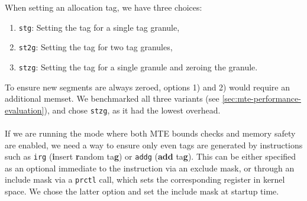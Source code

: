 When setting an allocation tag, we have three choices:
\begin{enumerate}
  \item \texttt{stg}: Setting the tag for a single tag granule,
  \item \texttt{st2g}: Setting the tag for two tag granules,
  \item \texttt{stzg}: Setting the tag for a single granule and zeroing the granule.
\end{enumerate}

To ensure new segments are always zeroed, options 1) and 2) would require an additional memset.
We benchmarked all three variants (see \cref{sec:mte-performance-evaluation}), and chose \texttt{stzg}, as it had the lowest overhead.

\paragraph{}
If we are running the mode where both \ac{MTE} bounds checks and memory safety are enabled, we need a way to ensure only even tags are generated by instructions such as \texttt{irg} (\textbf{i}nsert \textbf{r}andom ta\textbf{g}) or \texttt{addg} (\textbf{add} ta\textbf{g}).
This can be either specified as an optional immediate to the instruction via an exclude mask, or through an include mask via a \texttt{prctl} call, which sets the corresponding register in kernel space.
We chose the latter option and set the include mask at startup time.

